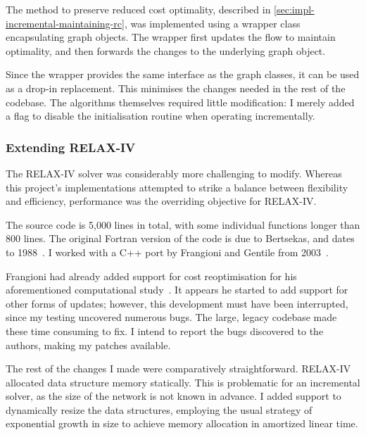The method to preserve reduced cost optimality, described in \cref{sec:impl-incremental-maintaining-rc}, was implemented using a wrapper class encapsulating graph objects. The wrapper first updates the flow to maintain optimality, and then forwards the changes to the underlying graph object.

Since the wrapper provides the same interface as the graph classes, it can be used as a drop-in replacement. This minimises the changes needed in the rest of the codebase. The algorithms themselves required little modification: I merely added a flag to disable the initialisation routine when operating incrementally.
 
\subsubsection{Extending RELAX-IV}
The RELAX-IV solver was considerably more challenging to modify. Whereas this project's implementations attempted to strike a balance between flexibility and efficiency, performance was the overriding objective for RELAX-IV. 

The source code is 5,000 lines in total, with some individual functions longer than 800 lines. The original Fortran version of the code is due to Bertsekas, and dates to 1988~\cite{BertsekasCodes:1988}. I worked with a C++ port by Frangioni and Gentile from 2003~\cite{RelaxIV:2011}.


Frangioni had already added support for cost reoptimisation for his aforementioned computational study~\cite{Frangioni:2006}. It appears he started to add support for other forms of updates; however, this development must have been interrupted, since my testing uncovered numerous bugs. The large, legacy codebase made these time consuming to fix. I intend to report the bugs discovered to the authors, making my patches available.

The rest of the changes I made were comparatively straightforward. RELAX-IV allocated data structure memory statically. This is problematic for an incremental solver, as the size of the network is not known in advance. I added support to dynamically resize the data structures, employing the usual strategy of exponential growth in size to achieve memory allocation in amortized linear time\footnotemark.

